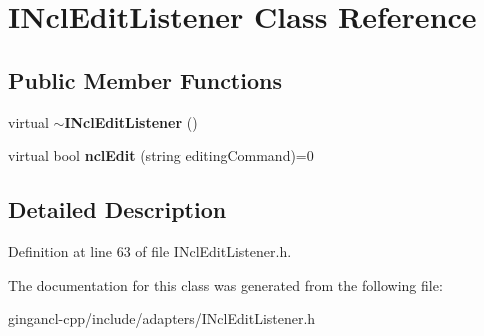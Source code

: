 \section{INclEditListener Class Reference}
\label{classbr_1_1pucrio_1_1telemidia_1_1ginga_1_1ncl_1_1adapters_1_1INclEditListener}
\subsection*{Public Member Functions}
\begin{CompactItemize}
\item 
virtual {\bf $\sim$INclEditListener} ()\label{classbr_1_1pucrio_1_1telemidia_1_1ginga_1_1ncl_1_1adapters_1_1INclEditListener_ec3491c8ee8b09c423356f4c78685375}

\item 
virtual bool \textbf{nclEdit} (string editingCommand)=0\label{classbr_1_1pucrio_1_1telemidia_1_1ginga_1_1ncl_1_1adapters_1_1INclEditListener_a7e1ec7b190103ad54fda2c866d25a8a}

\end{CompactItemize}


\subsection{Detailed Description}




Definition at line 63 of file INclEditListener.h.

The documentation for this class was generated from the following file:\begin{CompactItemize}
\item 
gingancl-cpp/include/adapters/INclEditListener.h\end{CompactItemize}
